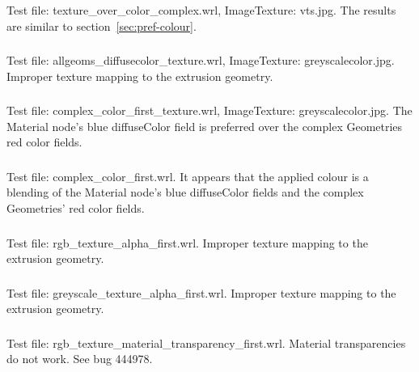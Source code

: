 \subsubsection{\MatIa\MatIb}
Test file: texture\_over\_color\_complex.wrl, ImageTexture: vts.jpg.\newline
The results are similar to section~\ref{sec:pref-colour}.

\subsubsection{\MatJa\MatJb}
Test file: allgeoms\_diffusecolor\_texture.wrl, ImageTexture:
greyscalecolor.jpg.\newline
Improper texture mapping to the extrusion geometry.

\subsubsection{\MatKa\MatKb}
Test file: complex\_color\_first\_texture.wrl, ImageTexture:
greyscalecolor.jpg.\newline
The Material node's blue diffuseColor field is preferred over the complex
Geometries red color fields.

\subsubsection{\MatL}
Test file: complex\_color\_first.wrl.\newline
It appears that the applied colour is a blending of the Material node's
blue diffuseColor fields and the complex Geometries' red color fields.

\setcounter{subsubsection}{23}
\subsubsection{\MatRa\MatRb}
Test file: rgb\_texture\_alpha\_first.wrl.\newline
Improper texture mapping to the extrusion geometry.

\subsubsection{\MatSa\MatSb}
Test file: greyscale\_texture\_alpha\_first.wrl.\newline
Improper texture mapping to the extrusion geometry.

\subsubsection{\MatTa\MatTb}
\label{sec:rgb-texture-mat-transparency}
Test file: rgb\_texture\_material\_transparency\_first.wrl.\newline
Material transparencies do not work.
See bug 444978.

